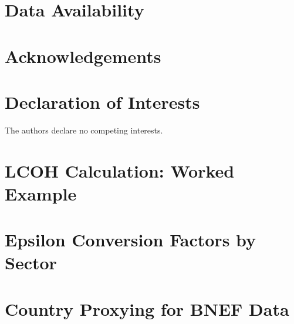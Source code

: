 \documentclass[12pt, a4paper]{article}
\begin{document}

\section*{Data Availability}

\section*{Acknowledgements}

\section*{Declaration of Interests}
The authors declare no competing interests.


\appendix
\section{LCOH Calculation: Worked Example}
\label{app:lcoh_example}


\section{Epsilon Conversion Factors by Sector}
\label{app:epsilon}

\section{Country Proxying for BNEF Data}
\label{app:proxying}
\end{document}
